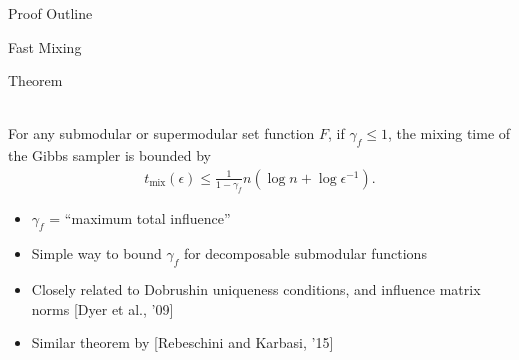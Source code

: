 \documentclass[mathserif]{beamer}
\newcommand{\qcite}[1]{{\scriptsize\color{col2}[#1]}}
\newcommand{\qtheorem}[1]{%
\begin{tcolorbox}[enhanced jigsaw,size=tight,boxsep=7pt,boxrule=0.7pt,coltext=textcolor,colframe=col2,colback=col1,opacityback=0,opacityframe=1]
\begin{minipage}{\textwidth}
{\color{col2}\strut Theorem}\\[0.7em]
#1
\end{minipage}
\end{tcolorbox}%
}
\begin{document}
\begin{frame}{Proof Outline}
%
\end{frame}

\begin{frame}{Fast Mixing}
\vspace{0.5em}
\qtheorem{
For any submodular or supermodular set function $F$, if $\gamma_f \leq 1$, the mixing time of the Gibbs sampler is bounded by
\vspace{-0.5em}
\begin{align*}
t_{\textrm{mix}}(\epsilon) \leq \frac{1}{1 - \gamma_f} n \left(\log n + \log\epsilon^{-1}\right).
\end{align*}
}

\vspace{0.5em}
\begin{itemize}
\item $\gamma_f$ = ``maximum total influence''
\vspace{0.5em}
\item Simple way to bound $\gamma_f$ for decomposable submodular functions
\vspace{0.5em}
\item Closely related to Dobrushin uniqueness conditions, and influence matrix norms \qcite{Dyer et al., '09}
\vspace{0.5em}
\item Similar theorem by \qcite{Rebeschini and Karbasi, '15}
\end{itemize}
\end{frame}
\end{document}
